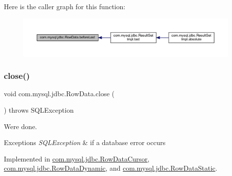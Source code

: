 Here is the caller graph for this function\+:
\nopagebreak
\begin{figure}[H]
\begin{center}
\leavevmode
\includegraphics[width=350pt]{interfacecom_1_1mysql_1_1jdbc_1_1_row_data_a64bc800ad28a97c6ad1f7d6a4958c187_icgraph}
\end{center}
\end{figure}
\mbox{\label{interfacecom_1_1mysql_1_1jdbc_1_1_row_data_ac548da95fe41cee544964af3b6d734a6}} 
\subsubsection{\texorpdfstring{close()}{close()}}
{\footnotesize\ttfamily void com.\+mysql.\+jdbc.\+Row\+Data.\+close (\begin{DoxyParamCaption}{ }\end{DoxyParamCaption}) throws S\+Q\+L\+Exception}

We\textquotesingle{}re done.


\begin{DoxyExceptions}{Exceptions}
{\em S\+Q\+L\+Exception} & if a database error occurs \\
\hline
\end{DoxyExceptions}


Implemented in \mbox{\hyperlink{classcom_1_1mysql_1_1jdbc_1_1_row_data_cursor_a8ffbd795d22ff847acae23bb8c51ea08}{com.\+mysql.\+jdbc.\+Row\+Data\+Cursor}}, \mbox{\hyperlink{classcom_1_1mysql_1_1jdbc_1_1_row_data_dynamic_a284d8e7db5b779d4c20de17f1f5b8c5c}{com.\+mysql.\+jdbc.\+Row\+Data\+Dynamic}}, and \mbox{\hyperlink{classcom_1_1mysql_1_1jdbc_1_1_row_data_static_a4c172a40caf7d38d4ae5441a9ea46d45}{com.\+mysql.\+jdbc.\+Row\+Data\+Static}}.

